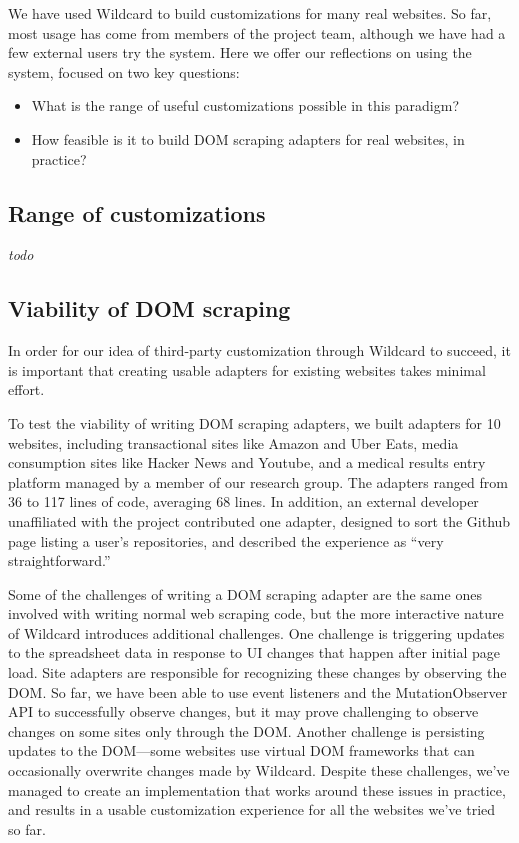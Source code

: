 \documentclass[sigplan,10pt,anonymous,review]{acmart}
\providecommand{\tightlist}{%
  \setlength{\itemsep}{0pt}\setlength{\parskip}{0pt}}
\begin{document}
We have used Wildcard to build customizations for many real websites. So
far, most usage has come from members of the project team, although we
have had a few external users try the system. Here we offer our
reflections on using the system, focused on two key questions:

\begin{itemize}
\tightlist
\item
  What is the range of useful customizations possible in this paradigm?
\item
  How feasible is it to build DOM scraping adapters for real websites,
  in practice?
\end{itemize}

\hypertarget{range-of-customizations}{%
\subsection{Range of customizations}\label{range-of-customizations}}

\emph{todo}

\hypertarget{viability-of-dom-scraping}{%
\subsection{Viability of DOM scraping}\label{viability-of-dom-scraping}}

In order for our idea of third-party customization through Wildcard to
succeed, it is important that creating usable adapters for existing
websites takes minimal effort.

To test the viability of writing DOM scraping adapters, we built
adapters for 10 websites, including transactional sites like Amazon and
Uber Eats, media consumption sites like Hacker News and Youtube, and a
medical results entry platform managed by a member of our research
group. The adapters ranged from 36 to 117 lines of code, averaging 68
lines. In addition, an external developer unaffiliated with the project
contributed one adapter, designed to sort the Github page listing a
user's repositories, and described the experience as ``very
straightforward.''

Some of the challenges of writing a DOM scraping adapter are the same
ones involved with writing normal web scraping code, but the more
interactive nature of Wildcard introduces additional challenges. One
challenge is triggering updates to the spreadsheet data in response to
UI changes that happen after initial page load. Site adapters are
responsible for recognizing these changes by observing the DOM. So far,
we have been able to use event listeners and the MutationObserver API to
successfully observe changes, but it may prove challenging to observe
changes on some sites only through the DOM. Another challenge is
persisting updates to the DOM---some websites use virtual DOM frameworks
that can occasionally overwrite changes made by Wildcard. Despite these
challenges, we've managed to create an implementation that works around
these issues in practice, and results in a usable customization
experience for all the websites we've tried so far.
\end{document}
